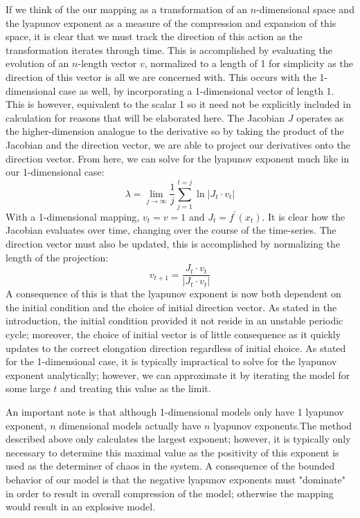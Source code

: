 If we think of the our mapping as a transformation of an $n$-dimensional space and the lyapunov exponent as a measure of the compression and expansion of this space, it is clear that we must track the direction of this action as the transformation iterates through time. This is accomplished by evaluating the evolution of an $n$-length vector $v$, normalized to a length of 1 for simplicity as the direction of this vector is all we are concerned with. This occurs with the 1-dimensional case as well, by incorporating a 1-dimensional vector of length 1. This is however, equivalent to the scalar 1 so it need not be explicitly included in calculation for reasons that will be elaborated here. The Jacobian $J$ operates as the higher-dimension analogue to the derivative so by taking the product of the Jacobian and the direction vector, we are able to project our derivatives onto the direction vector. From here, we can solve for the lyapunov exponent much like in our 1-dimensional case:
\begin{equation}
    \lambda = \lim_{j\to\infty}\frac{1}{j}\sum^{t=j}_{j=1}\ln\lvert J_t\cdot v_t\rvert
\end{equation}
With a 1-dimensional mapping, $v_t=v=1$ and $J_t=f^\prime(x_t)$. It is clear how the Jacobian evaluates over time, changing over the course of the time-series. The direction vector must also be updated, this is accomplished by normalizing the length of the projection:
\begin{equation}
    v_{t+1}=\frac{J_t\cdot v_t}{\lvert J_t\cdot v_t\rvert}
\end{equation}
A consequence of this is that the lyapunov exponent is now both dependent on the initial condition and the choice of initial direction vector\autocite{MedioAlfredo2001Ndap,Puu2003}. As stated in the introduction, the initial condition provided it not reside in an unstable periodic cycle; moreover, the choice of initial vector is of little consequence as it quickly updates to the correct elongation direction regardless of initial choice. As stated for the 1-dimensional case, it is typically impractical to solve for the lyapunov exponent analytically; however, we can approximate it by iterating the model for some large $t$ and treating this value as the limit.

An important note is that although 1-dimensional models only have 1 lyapunov exponent, $n$ dimensional models actually have $n$ lyapunov exponents.The method described above only calculates the largest exponent; however, it is typically only necessary to determine this maximal value as the positivity of this exponent is used as the determiner of chaos in the system. A consequence of the bounded behavior of our model is that the negative lyapunov exponents must "dominate" in order to result in overall compression of the model; otherwise the mapping would result in an explosive model. 

